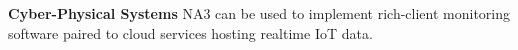 \begin{frame}{}
{\begin{minipage}{\textwidth}
{\begin{enumerate}
\vspace{16pt}
\dmitem \textbf{Cyber-Physical Systems}  \hspace{.5em} 
NA3 can be used to implement rich-client monitoring 
software paired to cloud services hosting 
realtime IoT data.




\end{enumerate}
}

\end{minipage}
}


\end{frame}
